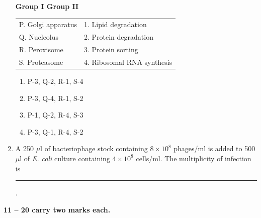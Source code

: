 \documentclass[journal,12pt,onecolumn]{IEEEtran}
\begin{document}
\begin{enumerate}[label=\arabic*.]
\textbf{Group I \hspace{2cm} Group II}

\begin{tabular}{ll}
P. Golgi apparatus & 1. Lipid degradation \\
Q. Nucleolus & 2. Protein degradation \\
R. Peroxisome & 3. Protein sorting \\
S. Proteasome & 4. Ribosomal RNA synthesis \\
\end{tabular}

\begin{multicols}{2}
\begin{enumerate}[label=(\Alph*)]
\item P-3, Q-2, R-1, S-4
\item P-3, Q-4, R-1, S-2
\item P-1, Q-2, R-4, S-3
\item P-3, Q-1, R-4, S-2
\end{enumerate}
\end{multicols}

\item A 250 $\mu$l of bacteriophage stock containing $8 \times 10^8$ phages/ml is added to 500 $\mu$l of \textit{E. coli} culture containing $4 \times 10^8$ cells/ml. The multiplicity of infection is \rule{2.5cm}{0.1pt}.

\end{enumerate}

\vspace{0.5cm}

\noindent\textbf{11 -- 20 carry two marks each.}
\end{document}
